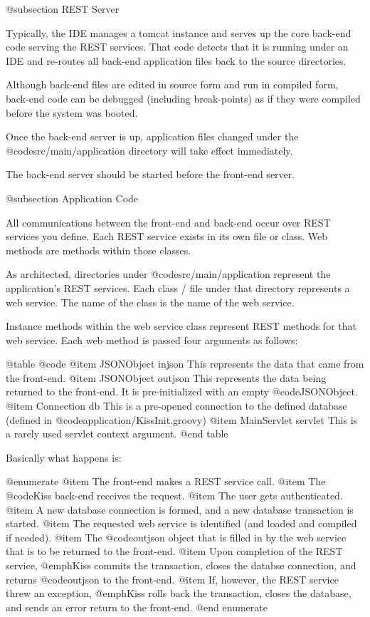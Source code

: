 @subsection REST Server

Typically, the IDE manages a tomcat instance and serves up the core
back-end code serving the REST services.  That code detects that it is
running under an IDE and re-routes all back-end application files back
to the source directories.

Although back-end files are edited in source form and run in compiled
form, back-end code can be debugged (including break-points) as if
they were compiled before the system was booted.

Once the back-end server is up, application files changed under the
@code{src/main/application} directory will take effect immediately.

The back-end server should be started before the front-end server.

@subsection Application Code

All communications between the front-end and back-end occur over REST
services you define.  Each REST service exists in its own
file or class.  Web methods are methods within those classes.

As architected, directories under @code{src/main/application}
represent the application's REST services.  Each class / file under that
directory represents a web service.  The name of the class is the name
of the web service.

Instance methods within the web service class represent REST methods
for that web service.  Each web method is passed four arguments as follows:

@table @code
@item JSONObject injson
This represents the data that came from the front-end.
@item JSONObject outjson
This represents the data being returned to the front-end.  It is pre-initialized with an empty @code{JSONObject}.
@item Connection db
This is a pre-opened connection to the defined database (defined in @code{application/KissInit.groovy})
@item MainServlet servlet
This is a rarely used servlet context argument.
@end table

Basically what happens is:

@enumerate
@item
The front-end makes a REST service call.
@item
The @code{Kiss} back-end receives the request.
@item
The user gets authenticated.
@item
A new database connection is formed, and a new database transaction is started.
@item
The requested web service is identified (and loaded and compiled if needed).
@item
The @code{outjson} object that is filled in by the web service that is to be returned to the front-end.
@item
Upon completion of the REST service, @emph{Kiss} commits the transaction, closes the databse connection, and returns @code{outjson} to the front-end.
@item
If, however, the REST service threw an exception, @emph{Kiss} rolls back the transaction, closes the database, and sends an error return to the front-end.
@end enumerate

